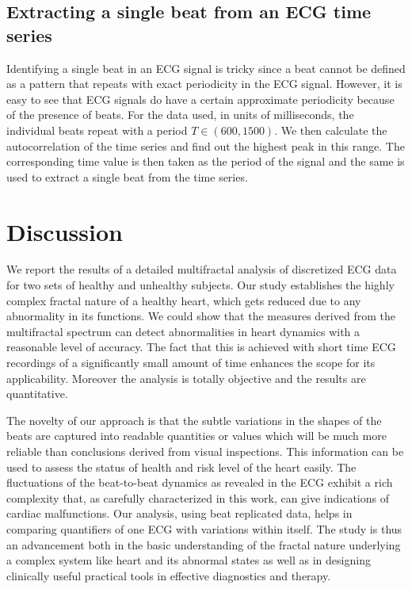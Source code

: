 \documentclass[9pt,twocolumn,twoside]{pnas-new}
\begin{document}
{\subsection{Extracting a single beat from an ECG time series}
Identifying a single beat in an ECG signal is tricky since a beat cannot be defined as a pattern that repeats with exact periodicity in the ECG signal. However, it is easy to see that ECG signals do have a certain approximate periodicity because of the presence of beats. For the data used, in units of milliseconds, the individual beats repeat with a period $T\in (600, 1500)$. We then calculate the autocorrelation of the time series and find out the highest peak in this range. The corresponding time value is then taken as the period of the signal and the same is used to extract a single beat from the time series. 

}

\section{Discussion}
We report the results of a detailed multifractal analysis of discretized ECG data for two sets of healthy and unhealthy subjects. Our study establishes the highly complex fractal nature of a healthy heart, which gets reduced due to any abnormality in its functions.  We could show that the measures derived from the multifractal spectrum can detect abnormalities in heart dynamics with a reasonable level of accuracy. The fact that this is achieved with short time ECG recordings of a significantly small amount of time enhances the scope for its applicability. Moreover the analysis is totally objective and the results are quantitative.

The novelty of our approach is that the subtle variations in the shapes of the beats are captured into readable quantities or values which will be much more reliable than conclusions derived from visual inspections. This information can be used to assess the status of health and risk level of the heart easily. The fluctuations of the beat-to-beat dynamics as revealed in the ECG exhibit a rich complexity that, as carefully characterized in this work, can give indications of cardiac malfunctions. Our analysis, using beat replicated data, helps in comparing quantifiers of one ECG with variations within itself. The study is thus an advancement both in the basic understanding of the fractal nature underlying a complex system like heart and its abnormal states as well as in designing clinically useful practical tools in effective diagnostics and therapy. 
\end{document}
